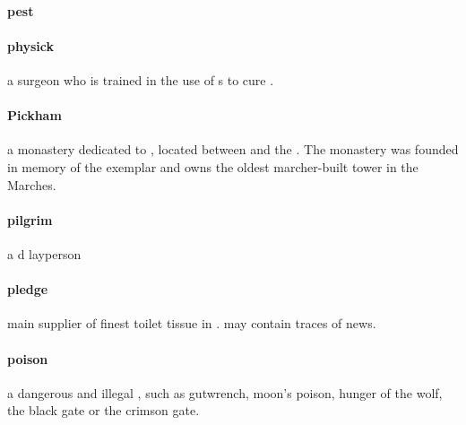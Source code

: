 \paragraph{pest} 
\paragraph{physick} a surgeon who is trained in the use of s to cure .
\paragraph{Pickham} a monastery dedicated to , located between  and the . The monastery was founded in memory of the exemplar  and owns the oldest marcher-built tower in the Marches.
\paragraph{pilgrim} a d layperson
\paragraph{pledge} main supplier of finest toilet tissue in . may contain traces of news.
\paragraph{poison} a dangerous and illegal , such as gutwrench, moon's poison, hunger of the wolf, the black gate or the crimson gate.
